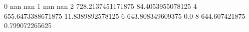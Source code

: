 0 nan nan
1 nan nan
2 728.2137451171875 84.4053955078125
4 655.6473388671875 11.8389892578125
6 643.808349609375 0.0
8 644.607421875 0.799072265625
